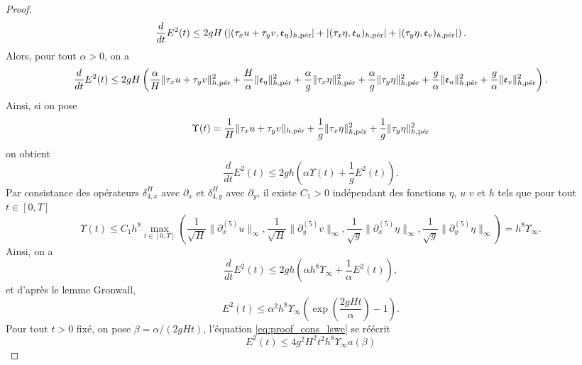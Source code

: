 \begin{proof}
\begin{equation}
\dfrac{d}{dt} E^2(t) \leq 2 g H \left( |(\tau_x u + \tau_y v, \mathfrak{e}_{\eta})_{h,\per}| + |(\tau_x \eta, \mathfrak{e}_u )_{h,\per}| + |(\tau_y \eta, \mathfrak{e}_v )_{h,\per}|  \right).
\end{equation}
Alors, pour tout $\alpha >0$, on a
\begin{equation}
\dfrac{d}{dt}E^2(t) \leq 2 gH \left( \dfrac{\alpha}{H} \| \tau_x u + \tau_y v \|_{h,\per}^2 + \dfrac{H}{\alpha} \| \mathfrak{e}_{\eta} \|_{h,\per}^2
+ \dfrac{\alpha}{g} \| \tau_x \eta \|_{h,\per}^2 + \dfrac{\alpha}{g} \| \tau_y \eta \|_{h,\per}^2  + \dfrac{g}{\alpha} \| \mathfrak{e}_u \|_{h,\per}^2 + \dfrac{g}{\alpha} \| \mathfrak{e}_v \|_{h,\per}^2  \right).
\end{equation}
Ainsi, si on pose 
\begin{equation}
\Upsilon(t) = \dfrac{1}{H} \| \tau_x u + \tau_y v \|_{h,\per} + \dfrac{1}{g} \| \tau_x \eta \|_{h,\per}^2 + \dfrac{1}{g} \| \tau_y \eta \|_{h,\per}^2
\end{equation}
on obtient
\begin{equation}
\dfrac{d}{dt}E^2(t) \leq 2gh \left( \alpha \Upsilon(t) + \dfrac{1}{g} E^2(t) \right).
\end{equation}
Par consistance des opérateurs $\delta_{4,x}^H$ avec $\partial_x$ et $\delta_{4,y}^H$ avec $\partial_y$, il existe $C_1>0$ indépendant des fonctions $\eta$, $u$ $v$ et $h$ tels que pour tout $t \in [0,T]$
\begin{equation}
\Upsilon(t) \leq C_1 h^8 \max_{t \in [0,T]} \left( \dfrac{1}{\sqrt{H}} \| \partial_x^{(5)} u \|_{\infty}, \dfrac{1}{\sqrt{H}} \| \partial_y^{(5)} v \|_{\infty}, \dfrac{1}{\sqrt{g}} \| \partial_x^{(5)} \eta \|_{\infty}, \dfrac{1}{\sqrt{g}} \| \partial_y^{(5)} \eta \|_{\infty}  \right) = h^8 \Upsilon_{\infty}.
\end{equation}
Ainsi, on a
\begin{equation}
\dfrac{d}{dt}E^2(t) \leq 2gh \left( \alpha h^8 \Upsilon_{\infty} + \dfrac{1}{\alpha} E^2(t) \right),
\label{eq:proof_cons_lswe}
\end{equation}
et d'après le lemme Gronwall,
\begin{equation}
E^2(t) \leq \alpha^2 h^8 \Upsilon_{\infty} \left( \exp \left( \dfrac{2gHt}{\alpha}  \right) -1 \right).
\end{equation}
Pour tout $t>0$ fixé, on pose $\beta = \alpha /(2gHt)$, l'équation \eqref{eq:proof_cons_lswe} se réécrit
\begin{equation}
E^2(t) \leq 4 g^2 H^2 t^2 h^8 \Upsilon_{\infty} a(\beta)

\end{equation}
\end{proof}
